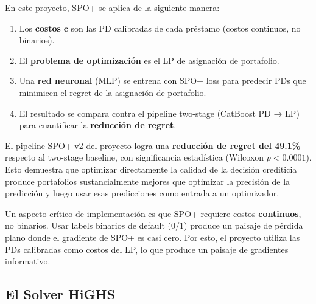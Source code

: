 \documentclass[
  spanish,
  11pt,
  letterpaper,
]{scrbook}
\providecommand{\tightlist}{%
  \setlength{\itemsep}{0pt}\setlength{\parskip}{0pt}}
\theoremstyle{plain}
\theoremstyle{remark}
\begin{document}
En este proyecto, SPO+ se aplica de la siguiente manera:

\begin{enumerate}
\def\labelenumi{\arabic{enumi}.}
\tightlist
\item
  Los \textbf{costos} \(\mathbf{c}\) son las PD calibradas de cada
  préstamo (costos continuos, no binarios).
\item
  El \textbf{problema de optimización} es el LP de asignación de
  portafolio.
\item
  Una \textbf{red neuronal} (MLP) se entrena con SPO+ loss para predecir
  PDs que minimicen el regret de la asignación de portafolio.
\item
  El resultado se compara contra el pipeline two-stage (CatBoost PD →
  LP) para cuantificar la \textbf{reducción de regret}.
\end{enumerate}

\begin{tcolorbox}[enhanced jigsaw, arc=.35mm, bottomrule=.15mm, bottomtitle=1mm, breakable, colback=white, colbacktitle=quarto-callout-note-color!10!white, colframe=quarto-callout-note-color-frame, coltitle=black, left=2mm, leftrule=.75mm, opacityback=0, opacitybacktitle=0.6, rightrule=.15mm, title=\textcolor{quarto-callout-note-color}{\faInfo}\hspace{0.5em}{Resultado empírico}, titlerule=0mm, toprule=.15mm, toptitle=1mm]

El pipeline SPO+ v2 del proyecto logra una \textbf{reducción de regret
del 49.1\%} respecto al two-stage baseline, con significancia
estadística (Wilcoxon \(p < 0.0001\)). Esto demuestra que optimizar
directamente la calidad de la decisión crediticia produce portafolios
sustancialmente mejores que optimizar la precisión de la predicción y
luego usar esas predicciones como entrada a un optimizador.

\end{tcolorbox}

Un aspecto crítico de implementación es que SPO+ requiere costos
\textbf{continuos}, no binarios. Usar labels binarios de default (0/1)
produce un paisaje de pérdida plano donde el gradiente de SPO+ es casi
cero. Por esto, el proyecto utiliza las PDs calibradas como costos del
LP, lo que produce un paisaje de gradientes informativo.

\subsection{El Solver HiGHS}\label{sec-highs-solver}
\end{document}
